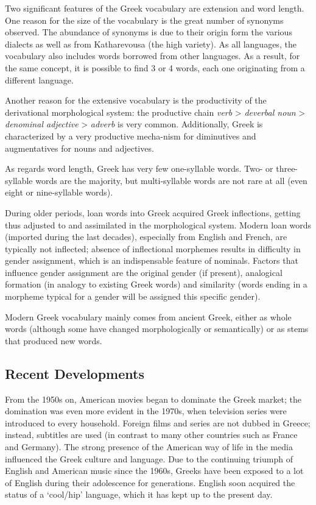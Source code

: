 \documentclass[]{../../metanetpaper}
\begin{document}
\begin{multicols}{2}
Two significant features of the Greek vocabulary are extension and word length. One reason for the size of the vocabulary is the great number of synonyms observed. The abundance of synonyms is due to their origin form the various dialects as well as from Katharevousa (the high variety). As all languages, the vocabulary also includes words borrowed from other languages. As a result, for the same concept, it is possible to find 3 or 4 words, each one originating from a different language.


Another reason for the extensive vocabulary is the productivity of the derivational morphological system: the productive chain \textit{verb} >  \textit{deverbal noun} >  \textit{denominal adjective} > \textit{adverb} is very common. Additionally, Greek is characterized by a very productive mecha-nism for diminutives and augmentatives for nouns and adjectives.

As regards word length, Greek has very few one-syllable words. Two- or three-syllable words are the majority, but multi-syllable words are not rare at all (even eight or nine-syllable words).

During older periods, loan words into Greek acquired Greek inflections, getting thus adjusted to and assimilated in the morphological system. Modern loan words (imported during the last decades), especially from English and French, are typically not inflected; absence of inflectional morphemes results in difficulty in gender assignment, which is an indispensable feature of nominals. Factors that influence gender assignment are the original gender (if present), analogical formation (in analogy to existing Greek words) and similarity (words ending in a morpheme typical for a gender will be assigned this specific gender).

Modern Greek vocabulary mainly comes from ancient Greek, either as whole words (although some have changed morphologically or semantically) or as stems that produced new words.

\subsection{Recent Developments}

From the 1950s on, American movies began to dominate the Greek market; the domination was even more evident in the 1970s, when television series were introduced to every household. Foreign films and series are not dubbed in Greece; instead, subtitles are used (in contrast to many other countries such as France and Germany). The strong presence of the American way of life in the media influenced the Greek culture and language. Due to the continuing triumph of English and American music since the 1960s, Greeks have been exposed to a lot of English during their adolescence for generations. English soon acquired the status of a ‘cool/hip’ language, which it has kept up to the present day.


\end{multicols}
\end{document}
